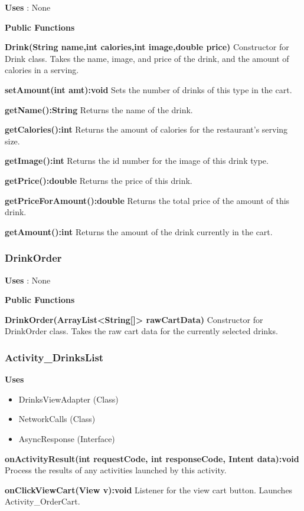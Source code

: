 \documentclass [10pt]{article}
\begin{document}
\textbf{Uses} : None

\textbf{Public Functions}

\textbf{Drink(String name,int calories,int image,double price)}
Constructor for Drink class. Takes the name, image, and price of the drink, and the amount of calories in a serving.

\textbf{setAmount(int amt):void}
Sets the number of drinks of this type in the cart.

\textbf{getName():String}
Returns the name of the drink.

\textbf{getCalories():int}
Returns the amount of calories for the restaurant's serving size.

\textbf{getImage():int}
Returns the id number for the image of this drink type.

\textbf{getPrice():double}
Returns the price of this drink.

\textbf{getPriceForAmount():double}
Returns the total price of the amount of this drink.

\textbf{getAmount():int}
Returns the amount of the drink currently in the cart.

\subsubsection{DrinkOrder}

\textbf{Uses} : None

\textbf{Public Functions}

\textbf{DrinkOrder(ArrayList<String[]> rawCartData)}
Constructor for DrinkOrder class. Takes the raw cart data for the currently selected drinks.

\subsubsection{Activity\_DrinksList}

\textbf{Uses}

\begin{itemize}
	\item DrinksViewAdapter (Class)
	\item NetworkCalls (Class)
	\item AsyncResponse (Interface)
\end{itemize}

\textbf{onActivityResult(int requestCode, int responseCode, Intent data):void}
Process the results of any activities launched by this activity.

\textbf{onClickViewCart(View v):void}
Listener for the view cart button. Launches Activity\_OrderCart.
\end{document}
